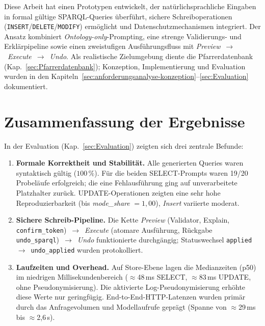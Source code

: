 Diese Arbeit hat einen Prototypen entwickelt, der natürlichsprachliche Eingaben in formal gültige SPARQL-Queries überführt, sichere Schreiboperationen (\texttt{INSERT}/\texttt{DELETE}/\texttt{MODIFY}) ermöglicht und Datenschutzmechanismen integriert. Der Ansatz kombiniert \emph{Ontology-only}-Prompting, eine strenge Validierungs- und Erklärpipeline sowie einen zweistufigen Ausführungsfluss mit \emph{Preview}~$\rightarrow$~\emph{Execute}~$\rightarrow$~\emph{Undo}. Als realistische Zielumgebung diente die Pfarrerdatenbank (Kap.~\ref{sec:Pfarrerdatenbank}); Konzeption, Implementierung und Evaluation wurden in den Kapiteln~\ref{sec:anforderungsanalyse-konzeption}–\ref{sec:Evaluation} dokumentiert.

\section*{Zusammenfassung der Ergebnisse}
In der Evaluation (Kap.~\ref{sec:Evaluation}) zeigten sich drei zentrale Befunde:
\begin{enumerate}
  \item \textbf{Formale Korrektheit und Stabilität.} Alle generierten Queries waren syntaktisch gültig (\(100\,\%\)). Für die beiden SELECT-Prompts waren 19/20 Probeläufe erfolgreich; die eine Fehlausführung ging auf unverarbeitete Platzhalter zurück. UPDATE-Operationen zeigten eine sehr hohe Reproduzierbarkeit (bis \emph{mode\_share} \(=1{,}00\)), \emph{Insert} variierte moderat.
  \item \textbf{Sichere Schreib-Pipeline.} Die Kette \emph{Preview} (Validator, Explain, \texttt{confirm\_token})~$\rightarrow$~\emph{Execute} (atomare Ausführung, Rückgabe \texttt{undo\_sparql})~$\rightarrow$~\emph{Undo} funktionierte durchgängig; Statuswechsel \texttt{applied}~$\rightarrow$~\texttt{undo\_applied} wurden protokolliert.
  \item \textbf{Laufzeiten und Overhead.} Auf Store-Ebene lagen die Medianzeiten (p50) im niedrigen Millisekundenbereich (\(\approx\)48\,ms SELECT, \(\approx\)83\,ms UPDATE, ohne Pseudonymisierung). Die aktivierte Log-Pseudonymisierung erhöhte diese Werte nur geringfügig. End-to-End-HTTP-Latenzen wurden primär durch das Anfragevolumen und Modellaufrufe geprägt (Spanne von \(\approx\)29\,ms bis \(\approx\)2{,}6\,s).
\end{enumerate}

